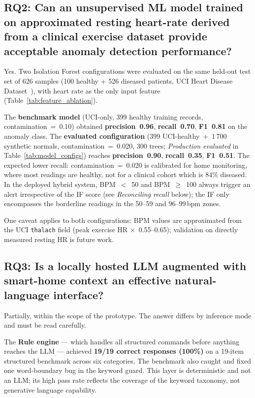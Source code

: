 \subsection*{RQ2: Can an unsupervised ML model trained on approximated resting heart-rate derived from a clinical exercise dataset provide acceptable anomaly detection performance?}

Yes.  Two Isolation Forest configurations were evaluated on the same held-out test set of 626 samples (100 healthy + 526 diseased patients, UCI Heart Disease Dataset~\cite{UCIHeartDisease1988}), with heart rate as the only input feature (Table~\ref{tab:feature_ablation}).

The \textbf{benchmark model} (UCI-only, 399 healthy training records, contamination~=~0.10) obtained \textbf{precision~0.96}, \textbf{recall~0.70}, \textbf{F1~0.81} on the anomaly class. The \textbf{evaluated configuration} (399 UCI-healthy~+~1\,700 synthetic normals, contamination~=~0.020, 300 trees; \emph{Production evaluated} in Table~\ref{tab:model_configs}) reaches \textbf{precision~0.90}, \textbf{recall~0.35}, \textbf{F1~0.51}. The expected lower recall: contamination~=~0.020 is calibrated for home monitoring, where most readings are healthy, not for a clinical cohort which is 84\% diseased. In the deployed hybrid system, BPM~$<$~50 and BPM~$\geq$~100 always trigger an alert irrespective of the IF score (see \emph{Reconciling recall} below); the IF only encompasses the borderline readings in the 50--59 and 96--99\,bpm zones.

One caveat applies to both configurations: BPM values are approximated from the UCI \texttt{thalach} field (peak exercise HR $\times$~0.55--0.65); validation on directly measured resting HR is future work.

\subsection*{RQ3: Is a locally hosted LLM augmented with smart-home context an effective natural-language interface?}

Partially, within the scope of the prototype. The answer differs by inference mode and must be read carefully.

The \textbf{Rule engine} --- which handles all structured commands before anything reaches the LLM --- achieved \textbf{19/19 correct responses (100\%)} on a 19-item structured benchmark across six categories. The benchmark also caught and fixed one word-boundary bug in the keyword guard. This layer is deterministic and not an LLM; its high pass rate reflects the coverage of the keyword taxonomy, not generative language capability.

